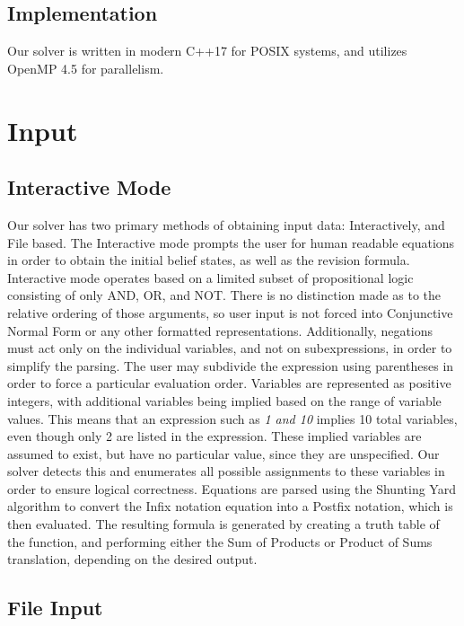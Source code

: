 \documentclass[english]{article}
\begin{document}
\subsection{Implementation}

Our solver is written in modern C++17 for POSIX systems, and utilizes
OpenMP 4.5 for parallelism.

\section{Input}

\subsection{Interactive Mode}

Our solver has two primary methods of obtaining input data: Interactively,
and File based. The Interactive mode prompts the user for human readable
equations in order to obtain the initial belief states, as well as
the revision formula. Interactive mode operates based on a limited
subset of propositional logic consisting of only AND, OR, and NOT.
There is no distinction made as to the relative ordering of those
arguments, so user input is not forced into Conjunctive Normal Form
or any other formatted representations. Additionally, negations must
act only on the individual variables, and not on subexpressions, in
order to simplify the parsing. The user may subdivide the expression
using parentheses in order to force a particular evaluation order.
Variables are represented as positive integers, with additional variables
being implied based on the range of variable values. This means that
an expression such as \emph{1 and 10 }implies 10 total variables,
even though only 2 are listed in the expression. These implied variables
are assumed to exist, but have no particular value, since they are
unspecified. Our solver detects this and enumerates all possible assignments
to these variables in order to ensure logical correctness. Equations
are parsed using the Shunting Yard algorithm to convert the Infix
notation equation into a Postfix notation, which is then evaluated.
The resulting formula is generated by creating a truth table of the
function, and performing either the Sum of Products or Product of
Sums translation, depending on the desired output.

\subsection{File Input}
\end{document}
